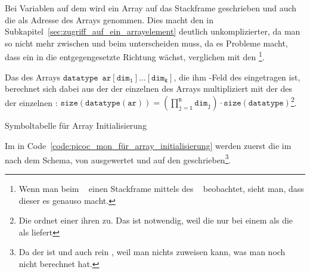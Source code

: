 Bei Variablen auf dem  wird ein Array  auf das Stackframe geschrieben und auch die  als Adresse des Arrays genommen. Dies macht den  in Subkapitel~\ref{sec:zugriff_auf_ein_arrayelement} deutlich unkomplizierter, da man so nicht mehr zwischen  und  beim  unterscheiden muss, da es Probleme macht, dass ein  in die entgegengesetzte Richtung wächst, verglichen mit den \footnote{Wenn man beim ~\cite{noauthor_gcc_nodate} einen Stackframe mittels des ~\cite{noauthor_gcc_nodate} beobachtet, sieht man, dass dieser es genauso macht.}.

\begin{Special_Paragraph}
  Das  des Arrays $\mathtt{datatype \enspace ar[dim_1]\ldots[dim_k]}$, die ihm -Feld des  eingetragen ist, berechnet sich dabei aus der  der einzelnen  des Arrays multipliziert mit der  des  der einzelnen : $\mathtt{size(datatype(ar)) = \left(\prod^n_{j=1} dim_j\right)\cdot size(datatype)}$\footnote{Die    ordnet einer   ihren  zu. Das ist notwendig, weil die   nur bei einem  als  die  als  liefert}.
\end{Special_Paragraph}

\begin{code}
  \centering
  \caption{Symboltabelle für Array Initialisierung}
  \label{code:symboltabelle_für_array_initialisierung}
\end{code}

Im  in Code~\ref{code:picoc_mon_für_array_initialisierung} werden zuerst die  im   nach dem  Schema, von  ausgewertet und auf den  geschrieben\footnote{Da der  \smalltt{=}  ist und auch rein , weil man nichts zuweisen kann, was man noch nicht berechnet hat.}.

